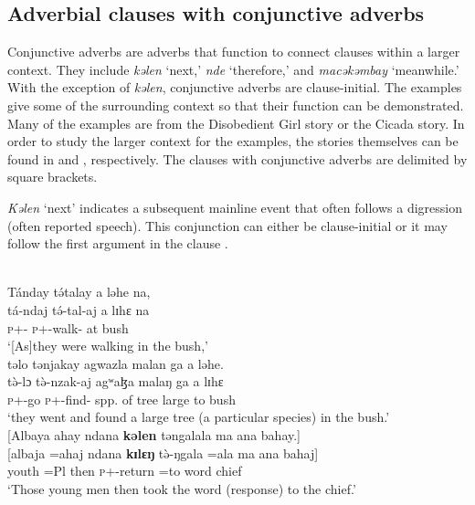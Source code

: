 \subsection{Adverbial clauses with conjunctive adverbs}\label{sec:12.3.4}
\hypertarget{RefHeading1213501525720847}{}
Conjunctive adverbs are adverbs that function to connect clauses within a larger  context. They include \textit{kəlen} ‘next,’ \textit{nde} ‘therefore,’ and \textit{macəkəmbay} ‘meanwhile.’ With the exception of \textit{kəlen}, conjunctive adverbs are clause-initial. The examples give some of the surrounding context so that their function can be demonstrated. Many of the examples are from the Disobedient Girl story or the Cicada story. In order to study the larger context for the examples, the stories themselves can be found in   and , respectively. The clauses with conjunctive adverbs are delimited by square brackets.

\textit{Kəlen} ‘next’ indicates a subsequent mainline event that often follows a digression (often reported speech). This conjunction can either be clause-initial  or it may follow the first argument in the clause .  

\ea \label{ex:12:56}
\\
Tánday  t\'{ə}talay  a  ləhe  na,\\    
\gll  tá-ndaj t\'{ə}-tal-aj a lɪhɛ  na\\  
      \textsc{p}+{\IFV}-{\PROG}   \textsc{p}+{\IFV}-walk-{\CL}     at   bush   {\PSP} \\          
\glt ‘[As]they were walking in the bush,’\\

\medskip
\clearpage
təlo  tənjakay  agwazla  malan  ga  a  ləhe.\\
\gll t\`{ə}-lɔ t\`{ə}-nzak-aj agʷaɮa malaŋ ga a lɪhɛ \\
     \textsc{p}+{\PFV}-go   \textsc{p}+{\PFV}-find-{\CL}   {spp. of tree}    large   {\ADJ}      to   bush \\
\glt ‘they went and found a large tree (a particular species) in the bush.’\\

\medskip
{}[Albaya  ahay  ndana \textbf{kəlen} təngalala  ma  ana  bahay.]\\
\gll {}[albaja =ahaj ndana \textbf{kɪlɛŋ} t\`{ə}-ŋgala =ala ma ana bahaj]\\
     youth    =Pl       {\DEM}  then  \textsc{p}+{\PFV}-return =to    word    {\DAT}   chief\\
\glt  ‘Those young men then took the word (response) to the chief.’  
\z 

